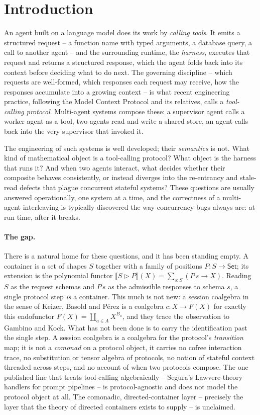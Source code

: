 \documentclass[11pt]{amsart}
\newcommand{\ctr}{\mathbin{\triangleright}}      %
\newcommand{\ext}[1]{\llbracket #1 \rrbracket}    %
\newcommand{\Set}{\mathsf{Set}}
\theoremstyle{plain}
\theoremstyle{definition}
\theoremstyle{remark}
\begin{document}
\section{Introduction}\label{sec:intro}

An agent built on a language model does its work by \emph{calling tools}. It emits a structured
request -- a function name with typed arguments, a database query, a call to another agent -- and
the surrounding runtime, the \emph{harness}, executes that request and returns a structured
response, which the agent folds back into its context before deciding what to do next. The
governing discipline -- which requests are well-formed, which responses each request may receive,
how the responses accumulate into a growing context -- is what recent engineering practice, following
the Model Context Protocol and its relatives, calls a \emph{tool-calling protocol}. Multi-agent
systems compose these: a supervisor agent calls a worker agent as a tool, two agents read and write
a shared store, an agent calls back into the very supervisor that invoked it.

The engineering of such systems is well developed; their \emph{semantics} is not. What kind of
mathematical object is a tool-calling protocol? What object is the harness that runs it? And when
two agents interact, what decides whether their composite behaves consistently, or instead diverges
into the re-entrancy and stale-read defects that plague concurrent stateful systems? These questions
are usually answered operationally, one system at a time, and the correctness of a multi-agent
interleaving is typically discovered the way concurrency bugs always are: at run time, after it
breaks.

\paragraph{The gap.}
There is a natural home for these questions, and it has been standing empty. A container
\cite{gambinokock} is a set of shapes $S$ together with a family of positions $P:S\to\Set$; its
extension is the polynomial functor $\ext{S\ctr P}(X)=\sum_{s:S}(P\,s\to X)$. Reading $S$ as the
request schemas and $P\,s$ as the admissible responses to schema $s$, a single protocol step
\emph{is} a container. This much is not new: a session coalgebra in the sense of Keizer, Basold and
P\'erez \cite{sessioncoalg} is a coalgebra $c:X\to F(X)$ for exactly this endofunctor
$F(X)=\coprod_{a\in A}X^{B_a}$, and they trace the observation to Gambino and Kock. What has not
been done is to carry the identification past the single step. A session coalgebra is a coalgebra
for the protocol's \emph{transition} map; it is not a \emph{comonad} on a protocol object, it carries
no cofree interaction trace, no substitution or tensor algebra of protocols, no notion of stateful
context threaded across steps, and no account of when two protocols compose. The one published line
that treats tool-calling algebraically -- Segura's Lawvere-theory handlers for prompt pipelines
\cite{segura} -- is protocol-agnostic and does not model the protocol object at all. The comonadic,
directed-container layer -- precisely the layer that the theory of directed containers exists to
supply -- is unclaimed.
\end{document}
